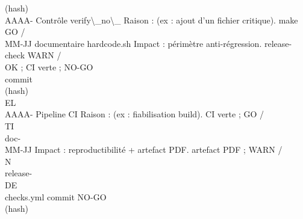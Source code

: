 (hash)\\
AAAA-          Contrôle     verify\textbackslash{}_no\textbackslash{}_                     Raison : (ex : ajout d’un fichier critique).                                                  make            GO /\\
MM-JJ          documentaire hardcode.sh                    Impact : périmètre anti-régression.                                                           release-check WARN /\\
OK ; CI verte ; NO-GO\\
commit\\
(hash)\\
\vspace{0.5em}
\vspace{0.5em}
\vspace{0.5em}
\vspace{0.5em}
EL\\
AAAA-          Pipeline CI                                 Raison : (ex : fiabilisation build).                                                          CI verte ;     GO /\\
\vspace{0.5em}
\vspace{0.5em}
\vspace{0.5em}
\vspace{0.5em}
TI\\
doc-\\
MM-JJ                                                      Impact : reproductibilité + artefact PDF.                                                     artefact PDF ; WARN /\\
\vspace{0.5em}
\vspace{0.5em}
\vspace{0.5em}
\vspace{0.5em}
N\\
release-\\
\vspace{0.5em}
\vspace{0.5em}
\vspace{0.5em}
\vspace{0.5em}
DE\\
checks.yml                                                                                                          commit         NO-GO\\
(hash)\\
\vspace{0.5em}
\vspace{0.5em}
